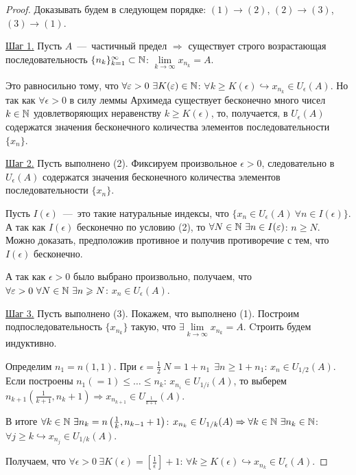 \begin{proof}
    Доказывать будем в следующем порядке: $(1) \to (2)$, $(2) \to (3)$, \newline $(3) \to (1)$.

    \underline{Шаг 1.} Пусть $A$~---~частичный предел $\Rightarrow$ существует строго возрастающая последовательность $\{ n_{k} \}^{\infty}_{k = 1} \subset \mathbb{N}$: $\lim\limits_{k\to \infty} x_{n_{k}} = A.$

    Это равносильно тому, что $\forall \varepsilon > 0 \  \exists K (\varepsilon) \in \mathbb{N}$: $\forall k \geq K (\epsilon) \hookrightarrow x_{n_{k}} \in U_{\epsilon} (A)$. Но так как $\forall \epsilon > 0$ в силу леммы Архимеда существует бесконечно много чисел $k \in \mathbb{N}$ удовлетворяющих неравенству $k \geq K (\epsilon)$, то, получается, в $U_{\epsilon} (A)$ содержатся значения бесконечного количества элементов последовательности $\{ x_{n} \}$.

    \underline{Шаг 2.} Пусть выполнено (2). Фиксируем произвольное $\epsilon > 0$, следовательно в $U_{\epsilon} (A)$ содержатся значения бесконечного количества элементов последовательности $\{ x_{n} \}$.

    Пусть $I (\epsilon)$~---~это такие натуральные индексы, что $\{ x_{n} \in U_{\epsilon} (A) \  \forall n \in I (\epsilon) \}$. А так как $I (\epsilon)$ бесконечно по условию (2), то $\forall N \in \mathbb{N} \  \exists n \in I (\varepsilon)$: $n \geq N$. Можно доказать, предположив противное и получив противоречие с тем, что $I (\epsilon)$ бесконечно.

    А так как $\epsilon > 0$ было выбрано произвольно, получаем, что $\forall \varepsilon > 0 \  \forall N \in \mathbb{N} \  \exists n \geqslant N$: $x_{n} \in U_{\epsilon} (A).$

    \underline{Шаг 3.} Пусть выполнено (3). Покажем, что выполнено (1). Построим подпоследовательность $\{ x_{n_{k}} \}$ такую, что $\exists \lim\limits_{k\to \infty} x_{n_{k}} = A$. Cтроить будем индуктивно.

    Определим $n_{1} = n(1, 1)$. При $\epsilon = \frac{1}{2} \ N = 1 + n_{1} \ \ \exists n \geq 1 + n_{1}$: $x_{n} \in U_{1/2} (A)$. Если построены $n_{1} (= 1) \leq \ldots \leq n_{k}$: $x_{n_{i}} \in U_{1/i} (A)$, то выберем $n_{k + 1} \left(\frac{1}{k + 1}, n_{k} + 1\right) \Rightarrow x_{n_{k + 1}} \in U_{\frac{1}{k + 1}} (A)$.

    В итоге $\forall k \in \mathbb{N} \ \exists n_{k} = n \left( \frac{1}{k}, n_{k - 1} + 1\right)$: $x_{n_{k}} \in U_{1 / k} (A) \Rightarrow \forall k \in \mathbb{N} \ \exists n_{k} \in \mathbb{N}$: $\forall j \geq k \hookrightarrow x_{n_{j}} \in U_{1/k} (A)$.

    Получаем, что $\forall \epsilon > 0 \ \exists K (\epsilon) = \left[ \frac{1}{\epsilon} \right] + 1$: $\forall k \geq K (\epsilon) \hookrightarrow x_{n_{k}} \in U_{\epsilon} (A)$.
\end{proof}
